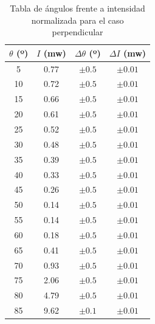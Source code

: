 \documentclass[11pt, a4paper, twocolumn]{article}
\begin{document}
\begin{table}[H]
    \centering
    \small
    \begin{tabular}{cccc}
        \hline
        $\theta$ (º) &   $I$ (mw) & $\Delta \theta$ (º)   & $\Delta I$ (mw)   \\
        \hline
                            5 &     0.77 & $\pm 0.5$                    & $\pm 0.01$      \\
                            10 &     0.72 & $\pm 0.5$                    & $\pm 0.01$      \\
                            15 &     0.66 & $\pm 0.5$                    & $\pm 0.01$      \\
                            20 &     0.61 & $\pm 0.5$                    & $\pm 0.01$      \\
                            25 &     0.52 & $\pm 0.5$                    & $\pm 0.01$      \\
                            30 &     0.48 & $\pm 0.5$                    & $\pm 0.01$      \\
                            35 &     0.39 & $\pm 0.5$                    & $\pm 0.01$      \\
                            40 &     0.33 & $\pm 0.5$                    & $\pm 0.01$      \\
                            45 &     0.26 & $\pm 0.5$                    & $\pm 0.01$      \\
                            50 &     0.14 & $\pm 0.5$                    & $\pm 0.01$      \\
                            55 &     0.14 & $\pm 0.5$                    & $\pm 0.01$      \\
                            60 &     0.18 & $\pm 0.5$                    & $\pm 0.01$      \\
                            65 &     0.41 & $\pm 0.5$                    & $\pm 0.01$      \\
                            70 &     0.93 & $\pm 0.5$                    & $\pm 0.01$      \\
                            75 &     2.06 & $\pm 0.5$                    & $\pm 0.01$      \\
                            80 &     4.79 & $\pm 0.5$                    & $\pm 0.01$      \\
                            85 &     9.62 & $\pm 0.1$                    & $\pm 0.01$      \\
        \hline
    \end{tabular}
    \caption{Tabla de ángulos frente a intensidad normalizada para el caso perpendicular}
    \label{Tabla_2}
\end{table}
\end{document}

